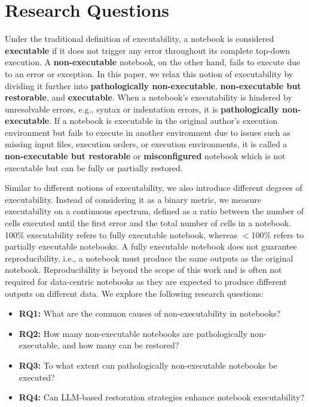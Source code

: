 \section{Research Questions}
\label{research questions}

Under the traditional definition of executability, a notebook is considered \textbf{executable} if it does not trigger any error throughout its complete top-down execution. A \textbf{non-executable} notebook, on the other hand, fails to execute due to an error or exception. In this paper, we relax this notion of executability by dividing it further into {\bf pathologically non-executable}, {\bf non-executable but restorable}, and {\bf executable}. When a notebook's executability is hindered by unresolvable errors, e.g., syntax or indentation errors, it is \textbf{pathologically non-executable}. If a notebook is executable in the original author's execution environment but fails to execute in another environment due to issues such as missing input files, execution orders, or execution environments, it is called a  {\bf non-executable but restorable} or {\bf misconfigured} notebook which is not executable but can be fully or partially restored. 

Similar to different notions of executability, we also introduce different degrees of executability. Instead of considering it as a binary metric, we measure executability on a continuous spectrum, defined as a ratio between the number of cells executed until the first error and the total number of cells in a notebook. 100\% executability refers to fully executable notebook, whereas $<$100\% refers to partially executable notebooks. A fully executable notebook does not guarantee reproducibility, i.e., a notebook must produce the same outputs as the original notebook. Reproducibility is beyond the scope of this work and is often not required for data-centric notebooks as they are expected to produce different outputs on different data. We explore the following research questions:

\begin{itemize}
    \item \textbf{RQ1:} What are the common causes of non-executability in notebooks?
    \item \textbf{RQ2:} How many non-executable notebooks are pathologically non-executable, and how many can be restored?
    \item \textbf{RQ3:} To what extent can pathologically non-executable notebooks be executed?
    \item \textbf{RQ4:} Can LLM-based restoration strategies enhance notebook executability?
\end{itemize}






